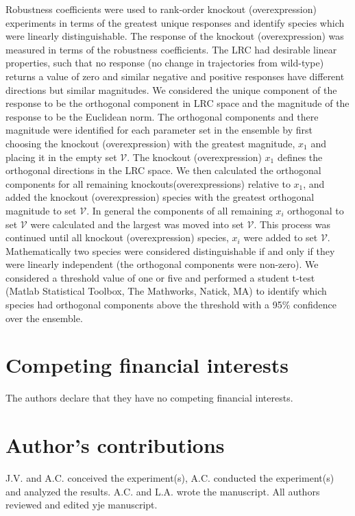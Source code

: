 \documentclass[fleqn,10pt]{wlscirep}
\begin{document}
Robustness coefficients were used to rank-order knockout (overexpression) experiments in terms of the greatest unique responses and identify species which were linearly distinguishable.
The response of the knockout (overexpression) was measured in terms of the robustness coefficients. The LRC had desirable linear properties, such that no response (no change in trajectories from wild-type) returns a value of zero and similar negative and positive responses have different directions but similar magnitudes.
We considered the unique component of the response to be the orthogonal component in LRC space and the magnitude of the response to be the Euclidean norm.
The orthogonal components and there magnitude were identified for each parameter set in the ensemble by first choosing the knockout (overexpression) with the greatest magnitude, $x_{1}$ and placing it in the empty set $\mathcal{V}$.
The knockout (overexpression) $x_{1}$ defines the orthogonal directions in the LRC space. We then calculated the orthogonal components for all remaining knockouts(overexpressions) relative to $x_{1}$, and added the knockout (overexpression) species with the greatest orthogonal magnitude to set $\mathcal{V}$.
In general the components of all remaining $x_{i}$ orthogonal to set $\mathcal{V}$ were calculated and the largest was moved into set $\mathcal{V}$. This process was continued until all knockout (overexpression) species, $x_{i}$ were added to set $\mathcal{V}$.
Mathematically two species were considered distinguishable if and only if they were linearly independent (the orthogonal components were non-zero).
We considered a threshold value of one or five and performed a student t-test (Matlab Statistical Toolbox, The Mathworks, Natick, MA) to identify which species had orthogonal components above the threshold with a 95\% confidence over the ensemble.

\clearpage

\section*{Competing financial interests}
The authors declare that they have no competing financial interests.

\section*{Author's contributions}
J.V. and A.C. conceived the experiment(s), A.C. conducted the experiment(s) and analyzed the results. A.C. and L.A. wrote the manuscript.
All authors reviewed and edited yje manuscript.
\end{document}
